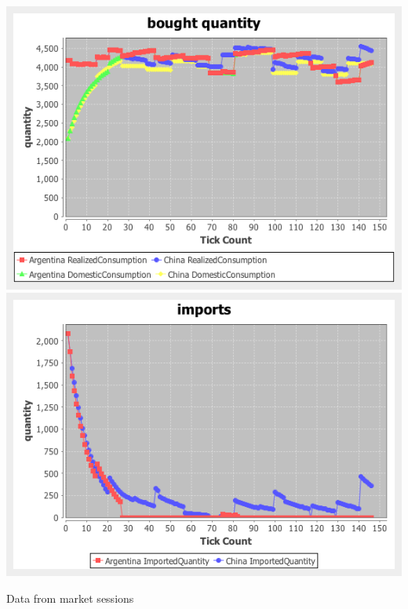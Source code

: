 \documentclass{article}
\begin{document}
\vskip2mm
\hskip-2cm
\includegraphics[scale=0.4]{fig_case2_qs}
\includegraphics[scale=0.4]{fig_case2_imports}

\noindent Data from market sessions
\end{document}
